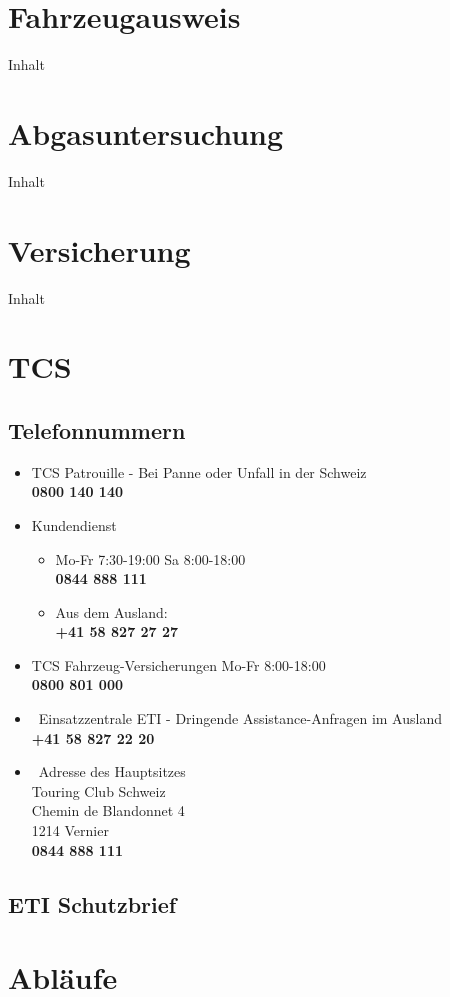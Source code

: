 \section{Fahrzeugausweis}
Inhalt
\section{Abgasuntersuchung}
Inhalt
\section{Versicherung}
Inhalt
\newpage
\section{TCS}
\subsection{Telefonnummern}
\begin{itemize}
    \item TCS Patrouille - Bei Panne oder Unfall in der Schweiz \\ \textbf{0800 140 140}
     \item Kundendienst 
\begin{itemize}
    \item Mo-Fr 7:30-19:00 Sa 8:00-18:00 \\ \textbf{0844 888 111}
    \item Aus dem Ausland: \\ \textbf{+41 58 827 27 27}
\end{itemize} 
\item TCS Fahrzeug-Versicherungen Mo-Fr 8:00-18:00 \\ \textbf{0800 801 000}
\item\ Einsatzzentrale ETI - Dringende Assistance-Anfragen im Ausland \\ \textbf{+41 58 827 22 20}
\item\ Adresse des Hauptsitzes \\
Touring Club Schweiz \\
Chemin de Blandonnet 4 \\
1214 Vernier \\
\textbf{0844 888 111}
\end{itemize} 

\subsection{ETI Schutzbrief}
\newpage
\section{Abläufe}
